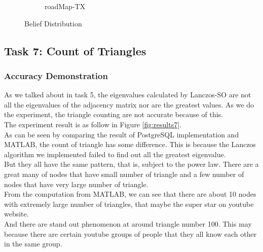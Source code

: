 \begin{figure}
\begin{subfigure}[htbp]{0.9\textwidth}
                \caption{roadMap-TX}
                \label{fig:bp-tx}
        \end{subfigure}
        \caption{Belief Distribution}
        \label{fig:results6-1}
\end{figure}


\subsection{Task 7: Count of Triangles}
\subsubsection{Accuracy Demonstration}
As we talked about in task 5, the eigenvalues calculated by Lanczos-SO are not all the eigenvalues of the adjacency matrix nor are the greatest values. As we do the experiment, the triangle counting are not accurate because of this. \\
The experiment result is as follow in Figure \ref{fig:results7}.\\
As can be seen by comparing the result of PostgreSQL implementation and MATLAB, the count of triangle has some difference. This is because the Lanczos algorithm we implemented failed to find out all the greatest eigenvalue. \\
But they all have the same pattern, that is, subject to the power law. There are a great many of nodes that have small number of triangle and a few number of nodes that have very large number of triangle.\\
From the computation from MATLAB, we can see that there are about 10 nodes with extremely large number of triangles, that maybe the super star on youtube website. \\
And there are stand out phenomenon at around triangle number 100. This may because there are certain youtube groups of people that they all know each other in the same group.

